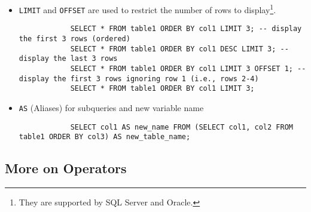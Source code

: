 \documentclass{article}
\begin{document}
\begin{itemize}
		\item \texttt{\color{red}LIMIT} and \texttt{\color{red}OFFSET} are used to restrict the number of rows to display\footnote{They are supported by SQL Server and Oracle.}.
		
		\begin{lstlisting}
			SELECT * FROM table1 ORDER BY col1 LIMIT 3; -- display the first 3 rows (ordered)
			SELECT * FROM table1 ORDER BY col1 DESC LIMIT 3; -- display the last 3 rows
			SELECT * FROM table1 ORDER BY col1 LIMIT 3 OFFSET 1; -- display the first 3 rows ignoring row 1 (i.e., rows 2-4)
			SELECT * FROM table1 ORDER BY col1 LIMIT 3;
		\end{lstlisting}
		\item \texttt{\color{red}AS} (Aliases) for subqueries and new variable name
		
		\begin{lstlisting}
			SELECT col1 AS new_name FROM (SELECT col1, col2 FROM table1 ORDER BY col3) AS new_table_name;
		\end{lstlisting}
	\end{itemize}
	
	
	
	\subsection{More on Operators}
	
\end{document}
